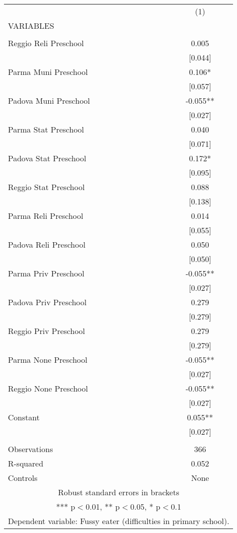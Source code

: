 \begin{tabular}{lc} \hline
 & (1) \\
VARIABLES &  \\ \hline
 &  \\
Reggio Reli Preschool & 0.005 \\
 & [0.044] \\
Parma Muni Preschool & 0.106* \\
 & [0.057] \\
Padova Muni Preschool & -0.055** \\
 & [0.027] \\
Parma Stat Preschool & 0.040 \\
 & [0.071] \\
Padova Stat Preschool & 0.172* \\
 & [0.095] \\
Reggio Stat Preschool & 0.088 \\
 & [0.138] \\
Parma Reli Preschool & 0.014 \\
 & [0.055] \\
Padova Reli Preschool & 0.050 \\
 & [0.050] \\
Parma Priv Preschool & -0.055** \\
 & [0.027] \\
Padova Priv Preschool & 0.279 \\
 & [0.279] \\
Reggio Priv Preschool & 0.279 \\
 & [0.279] \\
Parma None Preschool & -0.055** \\
 & [0.027] \\
Reggio None Preschool & -0.055** \\
 & [0.027] \\
Constant & 0.055** \\
 & [0.027] \\
 &  \\
Observations & 366 \\
R-squared & 0.052 \\
 Controls & None \\ \hline
\multicolumn{2}{c}{ Robust standard errors in brackets} \\
\multicolumn{2}{c}{ *** p$<$0.01, ** p$<$0.05, * p$<$0.1} \\
\multicolumn{2}{c}{ Dependent variable: Fussy eater (difficulties in primary school).} \\
\end{tabular}
